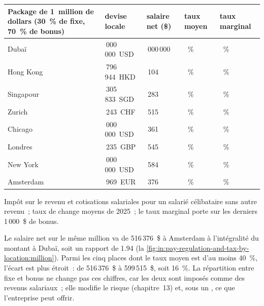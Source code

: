 \begin{center}\footnotesize
\begin{tabular}{@{}>{\raggedright\arraybackslash}p{4.0cm}>{\centering\arraybackslash}p{2.6cm}>{\centering\arraybackslash}p{2.4cm}>{\centering\arraybackslash}p{1.8cm}>{\centering\arraybackslash}p{1.8cm}@{}}
\toprule
Package de 1~million de dollars (30~\% de fixe, 70~\% de bonus) & devise locale & salaire net (\$) & taux moyen & taux marginal\\
\midrule
Dubaï & 1\,000\,000~USD & 1\,000\,000 & 0.0~\% & 0.0~\%\\
Hong Kong & 7\,796\,944~HKD & 844\,104 & 15.6~\% & 16.0~\%\\
Singapour & 1\,305\,833~SGD & 791\,283 & 20.9~\% & 24.0~\%\\
Zurich & 829\,243~CHF & 599\,515 & 40.0~\% & 44.4~\%\\
Chicago & 1\,000\,000~USD & 597\,361 & 40.3~\% & 44.3~\%\\
Londres & 758\,235~GBP & 545\,545 & 45.4~\% & 47.0~\%\\
New York & 1\,000\,000~USD & 540\,584 & 45.9~\% & 50.1~\%\\
Amsterdam & 884\,969~EUR & 516\,376 & 48.4~\% & 49.5~\%\\
\bottomrule
\end{tabular}

\smallskip Impôt sur le revenu et cotisations salariales pour un salarié célibataire sans autre revenu~; taux de change moyens
de 2025~; le taux marginal porte sur les derniers 1\,000~\$ de bonus.
\end{center}

Le salaire net sur le même million va de 516\,376~\$ à Amsterdam à l'intégralité du montant à Dubaï, soit un rapport de 1.94
(la \cref{fig:in:pay-regulation-and-tax-by-location:million}). Parmi les cinq places dont le taux moyen est d'au moins 40~\%,
l'écart est plus étroit~: de 516\,376~\$ à 599\,515~\$, soit 16~\%. La répartition entre fixe et bonus ne change pas ces chiffres, car les deux sont
imposés comme des revenus salariaux~; elle modifie le risque (chapitre~13) et, sous un , ce que l'entreprise peut offrir.

